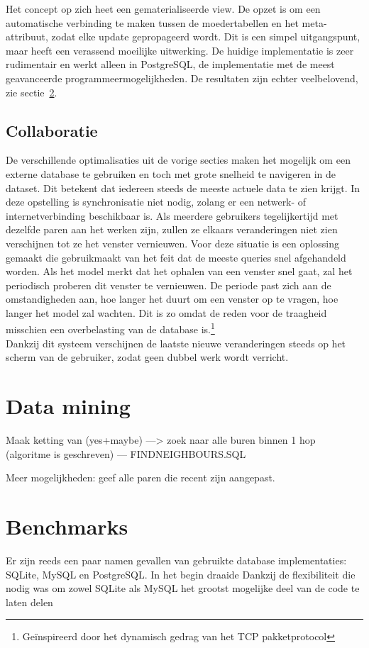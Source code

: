 Het concept op zich heet een gematerialiseerde view. De opzet is om een automatische verbinding te maken tussen de moedertabellen en het meta-attribuut, zodat elke update gepropageerd wordt. Dit is een simpel uitgangspunt, maar heeft een verassend moeilijke uitwerking. De huidige implementatie is zeer rudimentair en werkt alleen in PostgreSQL, de implementatie met de meest geavanceerde programmeermogelijkheden. De resultaten zijn echter veelbelovend, zie sectie~\ref{sec:benchmarks}.

\subsection{Collaboratie}
De verschillende optimalisaties uit de vorige secties maken het mogelijk om een externe database te gebruiken en toch met grote snelheid te navigeren in de dataset. Dit betekent dat iedereen steeds de meeste actuele data te zien krijgt. In deze opstelling is synchronisatie niet nodig, zolang er een netwerk- of internetverbinding beschikbaar is. Als meerdere gebruikers tegelijkertijd met dezelfde paren aan het werken zijn, zullen ze elkaars veranderingen niet zien verschijnen tot ze het venster vernieuwen. Voor deze situatie is een oplossing gemaakt die gebruikmaakt van het feit dat de meeste queries snel afgehandeld worden. Als het model merkt dat het ophalen van een venster snel gaat, zal het periodisch proberen dit venster te vernieuwen. De periode past zich aan de omstandigheden aan, hoe langer het duurt om een venster op te vragen, hoe langer het model zal wachten. Dit is zo omdat de reden voor de traagheid misschien een overbelasting van de database is.\footnote{Ge\"inspireerd door het dynamisch gedrag van het TCP pakketprotocol}\\

Dankzij dit systeem verschijnen de laatste nieuwe veranderingen steeds op het scherm van de gebruiker, zodat geen dubbel werk wordt verricht.

\section{Data mining}
Maak ketting van (yes+maybe) ---> zoek naar alle buren binnen 1 hop (algoritme is geschreven) --- FINDNEIGHBOURS.SQL

Meer mogelijkheden: geef alle paren die recent zijn aangepast.


\section{Benchmarks}
\label{sec:benchmarks}
Er zijn reeds een paar namen gevallen van gebruikte database implementaties: SQLite, MySQL en PostgreSQL. In het begin draaide 
Dankzij de flexibiliteit die nodig was om zowel SQLite als MySQL het grootst mogelijke deel van de code te laten delen


